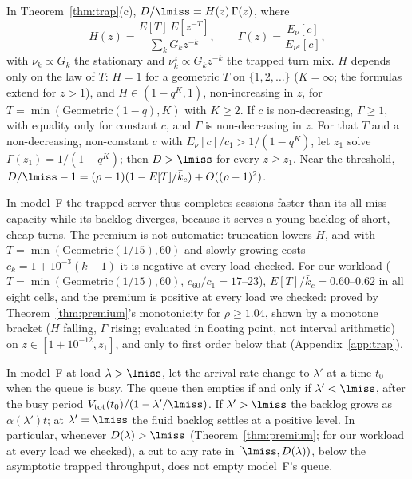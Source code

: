 \begin{theorem}\label{thm:premium}
In Theorem~\ref{thm:trap}(c), $D/\lmiss=H(z)\,\Gamma(z)$, where
\[
H(z)=\frac{E[T]\,E[z^{-T}]}{\sum_kG_kz^{-k}},\qquad \Gamma(z)=\frac{E_\nu[c]}{E_{\nu^z}[c]},
\]
with $\nu_k\propto G_k$ the stationary and $\nu^z_k\propto G_kz^{-k}$ the trapped turn mix. $H$ depends only on the law of $T$:
$H=1$ for a geometric $T$ on $\{1,2,\dots\}$ ($K=\infty$; the formulas extend for $z>1$), and $H\in(1-q^K,1)$, non-increasing
in $z$, for $T=\min(\mathrm{Geometric}(1-q),K)$ with $K\ge2$. If $c$ is non-decreasing, $\Gamma\ge1$, with equality only for
constant $c$, and $\Gamma$ is non-decreasing in $z$. For that $T$ and a non-decreasing, non-constant $c$ with
$E_\nu[c]/c_1>1/(1-q^K)$, let $z_1$ solve $\Gamma(z_1)=1/(1-q^K)$; then $D>\lmiss$ for every $z\ge z_1$. Near the threshold,
$D/\lmiss-1=(\rho-1)(1-E[T]/\bar k_c)+O((\rho-1)^2)$.
\end{theorem}

\noindent In model~F the trapped server thus completes sessions faster than its all-miss capacity while its backlog diverges, because it
serves a young backlog of short, cheap turns. The premium is not automatic: truncation lowers $H$, and with
$T=\min(\mathrm{Geometric}(1/15),60)$ and slowly growing costs $c_k=1+10^{-3}(k-1)$ it is negative at every load checked. For
our workload ($T=\min(\mathrm{Geometric}(1/15),60)$, $c_{60}/c_1=17$--23), $E[T]/\bar k_c=0.60$--$0.62$ in all eight cells, and
the premium is positive at every load we checked: proved by Theorem~\ref{thm:premium}'s monotonicity for $\rho\ge1.04$, shown
by a monotone bracket ($H$ falling, $\Gamma$ rising; evaluated in floating point, not interval arithmetic) on
$z\in[1+10^{-12},z_1]$, and only to first order below that (Appendix~\ref{app:trap}).

\begin{corollary}\label{cor:trapthr}
In model~F at load $\lambda>\lmiss$, let the arrival rate change to $\lambda'$ at a time $t_0$ when the queue is busy. The
queue then empties if and only if $\lambda'<\lmiss$, after the busy period $V_{\mathrm{tot}}(t_0)/(1-\lambda'/\lmiss)$. If
$\lambda'>\lmiss$ the backlog grows as $\alpha(\lambda')t$; at $\lambda'=\lmiss$ the fluid backlog settles at a positive
level. In particular, whenever $D(\lambda)>\lmiss$ (Theorem~\ref{thm:premium}; for our workload at every load we checked), a
cut to any rate in $[\lmiss,D(\lambda))$, below the asymptotic trapped throughput, does not empty model~F's queue.
\end{corollary}

